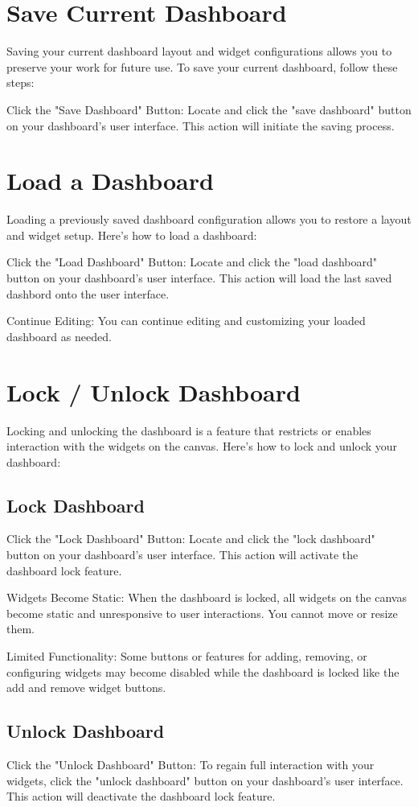 \section{Save Current Dashboard}
Saving your current dashboard layout and widget configurations allows you to preserve your work for future use. To save your current dashboard, follow these steps:

Click the "Save Dashboard" Button: Locate and click the "save dashboard" button on your dashboard's user interface. This action will initiate the saving process.

\section{Load a Dashboard}
Loading a previously saved dashboard configuration allows you to restore a layout and widget setup. Here's how to load a dashboard:

Click the "Load Dashboard" Button: Locate and click the "load dashboard" button on your dashboard's user interface. This action will load the last saved dashbord onto the user interface.

Continue Editing: You can continue editing and customizing your loaded dashboard as needed.

\section{Lock / Unlock Dashboard}
Locking and unlocking the dashboard is a feature that restricts or enables interaction with the widgets on the canvas. Here's how to lock and unlock your dashboard:

\subsection{Lock Dashboard}
Click the "Lock Dashboard" Button: Locate and click the "lock dashboard" button on your dashboard's user interface. This action will activate the dashboard lock feature.

Widgets Become Static: When the dashboard is locked, all widgets on the canvas become static and unresponsive to user interactions. You cannot move or resize them.

Limited Functionality: Some buttons or features for adding, removing, or configuring widgets may become disabled while the dashboard is locked like the add and remove widget buttons. 

\subsection{Unlock  Dashboard}
Click the "Unlock Dashboard" Button: To regain full interaction with your widgets, click the "unlock dashboard" button on your dashboard's user interface. This action will deactivate the dashboard lock feature.

